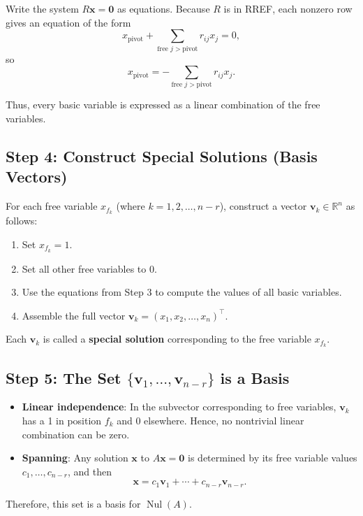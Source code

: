 \documentclass{article}
\begin{document}
Write the system $R\mathbf{x} = \mathbf{0}$ as equations. Because $R$ is in RREF, each nonzero row gives an equation of the form
\[
x_{\text{pivot}} + \sum_{\text{free } j > \text{pivot}} r_{ij} x_j = 0,
\]
so
\[
x_{\text{pivot}} = -\sum_{\text{free } j > \text{pivot}} r_{ij} x_j.
\]

Thus, every basic variable is expressed as a linear combination of the free variables.

\subsection*{Step 4: Construct Special Solutions (Basis Vectors)}

For each free variable $x_{f_k}$ (where $k = 1, 2, \dots, n - r$), construct a vector $\mathbf{v}_k \in \mathbb{R}^n$ as follows:
\begin{enumerate}[label=(\alph*)]
    \item Set $x_{f_k} = 1$.
    \item Set all other free variables to $0$.
    \item Use the equations from Step 3 to compute the values of all basic variables.
    \item Assemble the full vector $\mathbf{v}_k = (x_1, x_2, \dots, x_n)^\top$.
\end{enumerate}

Each $\mathbf{v}_k$ is called a \textbf{special solution} corresponding to the free variable $x_{f_k}$.

\subsection*{Step 5: The Set $\{ \mathbf{v}_1, \dots, \mathbf{v}_{n-r} \}$ is a Basis}

\begin{itemize}
\item \textbf{Linear independence}: In the subvector corresponding to free variables, $\mathbf{v}_k$ has a 1 in position $f_k$ and 0 elsewhere. Hence, no nontrivial linear combination can be zero.
    \item \textbf{Spanning}: Any solution $\mathbf{x}$ to $A\mathbf{x} = \mathbf{0}$ is determined by its free variable values $c_1, \dots, c_{n-r}$, and then
    \[
    \mathbf{x} = c_1 \mathbf{v}_1 + \cdots + c_{n-r} \mathbf{v}_{n-r}.
    \]
\end{itemize}

Therefore, this set is a basis for $\operatorname{Nul}(A)$.
\end{document}
